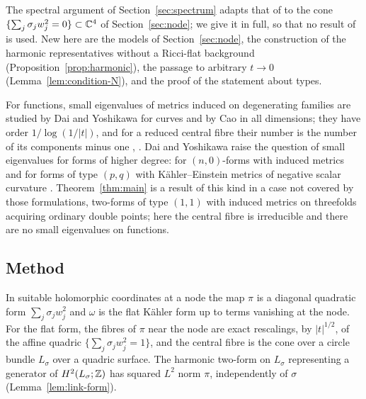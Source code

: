 The spectral argument of Section~\ref{sec:spectrum} adapts that of
\cite[Sections~4--6]{wuebben-conifold} to the cone $\{\sum_j\sigma_jw_j^2=0\}\subset\mathbb C^4$ of
Section~\ref{sec:node}; we
give it in full, so that no result of \cite{wuebben-conifold} is used.
New here are the models of Section~\ref{sec:node},
the construction of the harmonic representatives without a Ricci-flat
background (Proposition~\ref{prop:harmonic}), the passage to arbitrary
$t\to0$ (Lemma~\ref{lem:condition-N}), and the proof of the statement
about types.

For functions, small eigenvalues of metrics induced on degenerating
families are studied by Dai and Yoshikawa \cite{dai-yoshikawa} for curves
and by Cao \cite{cao} in all dimensions; they have order
$1/\log(1/|t|)$, and for a reduced central fibre their number is the
number of its components minus one
\cite[Theorem~0.2]{dai-yoshikawa}, \cite[Theorem~0.4]{cao}. Dai and Yoshikawa raise the question
of small eigenvalues for forms of higher degree: for $(n,0)$-forms with
induced metrics and for forms of type $(p,q)$ with K\"ahler--Einstein
metrics of negative scalar curvature
\cite[Conjecture~9.5 and Problem~9.7]{dai-yoshikawa}.
Theorem~\ref{thm:main} is a result of this kind in a case not covered by
those formulations, two-forms of type $(1,1)$ with induced metrics
on threefolds acquiring ordinary double points; here the central fibre
is irreducible and there are no small eigenvalues on functions.

\subsection{Method}
In suitable holomorphic coordinates at a node the map $\pi$ is a
diagonal quadratic form $\sum_j\sigma_jw_j^2$ and $\omega$ is the flat
K\"ahler form up to terms vanishing at the node. For the flat form, the
fibres of $\pi$ near the node are exact rescalings, by $|t|^{1/2}$, of
the affine quadric $\{\sum_j\sigma_jw_j^2=1\}$, and the central fibre is
the cone over a circle bundle $L_\sigma$ over a quadric surface. The
harmonic two-form on $L_\sigma$ representing a generator of
$H^2(L_\sigma;\mathbb Z)$ has squared $L^2$ norm $\pi$, independently of $\sigma$ (Lemma~\ref{lem:link-form}).

